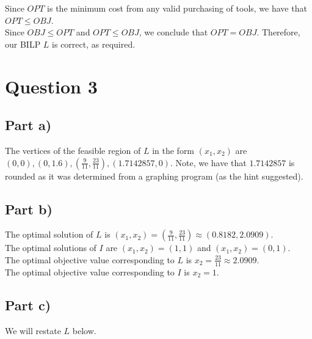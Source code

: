 \documentclass[12pt]{article}
\begin{document}
Since $OPT$ is the minimum cost from any valid purchasing of tools, we have that $OPT \leq OBJ$. \\

Since $OBJ \leq OPT$ and $OPT \leq OBJ$, we conclude that $OPT = OBJ$. Therefore, our BILP $L$ is correct, as required. 







\newpage

\section*{Question 3}

\subsection*{Part a)}

The vertices of the feasible region of $L$ in the form $(x_1, x_2)$ are $(0,0), (0,1.6), (\frac{9}{11}, \frac{23}{11}), (1.7142857, 0)$. Note, we have that $1.7142857$ is rounded as it was determined from a graphing program (as the hint suggested). 

\subsection*{Part b)}

The optimal solution of $L$ is $(x_1,x_2) = (\frac{9}{11}, \frac{23}{11}) \approx (0.8182, 2.0909)$. \\

The optimal solutions of $I$ are $(x_1,x_2) = (1,1)$ and $(x_1, x_2) = (0,1)$. \\

The optimal objective value corresponding to $L$ is $x_2 = \frac{23}{11} \approx 2.0909$. \\

The optimal objective value corresponding to $I$ is $x_2 = 1$. 

\subsection*{Part c)}

We will restate $L$ below. 
\end{document}
